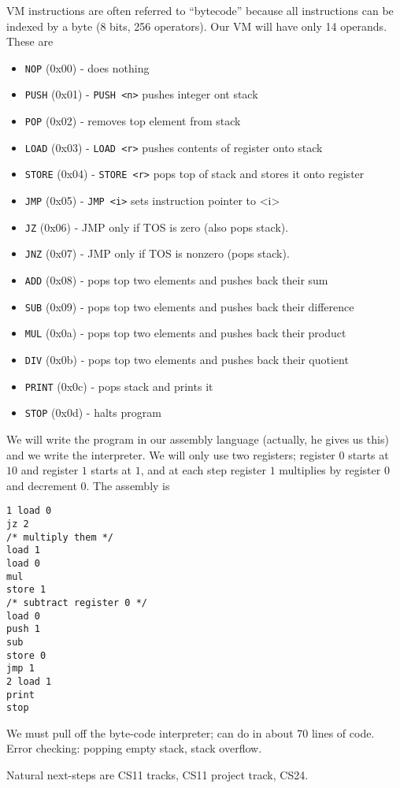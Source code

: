 \documentclass[10pt,landscape, twocolumn]{article}
\begin{document}
VM instructions are often referred to ``bytecode'' because all instructions can be indexed by a byte (8 bits, 256 operators). Our VM will have only 14 operands. These are
\begin{itemize}
    \item \texttt{NOP} (0x00) - does nothing
    \item \texttt{PUSH} (0x01) - \texttt{PUSH <n>} pushes integer ont stack
    \item \texttt{POP} (0x02) - removes top element from stack
    \item \texttt{LOAD} (0x03) - \texttt{LOAD <r>} pushes contents of register onto stack
    \item \texttt{STORE} (0x04) - \texttt{STORE <r>} pops top of stack and stores it onto register
    \item \texttt{JMP} (0x05) - \texttt{JMP <i>} sets instruction pointer to <i>
    \item \texttt{JZ} (0x06) - JMP only if TOS is zero (also pops stack).
    \item \texttt{JNZ} (0x07) - JMP only if TOS is nonzero (pops stack).
    \item \texttt{ADD} (0x08) - pops top two elements and pushes back their sum
    \item \texttt{SUB} (0x09) - pops top two elements and pushes back their difference
    \item \texttt{MUL} (0x0a) - pops top two elements and pushes back their product
    \item \texttt{DIV} (0x0b) - pops top two elements and pushes back their quotient
    \item \texttt{PRINT} (0x0c) - pops stack and prints it
    \item \texttt{STOP} (0x0d) - halts program
\end{itemize}

We will write the program in our assembly language (actually, he gives us this) and we write the interpreter. We will only use two  registers; register $0$ starts at $10$ and register $1$ starts at $1$, and at each step register $1$ multiplies by register $0$ and decrement $0$. The assembly is
\begin{verbatim}
1 load 0
jz 2
/* multiply them */ 
load 1
load 0
mul
store 1
/* subtract register 0 */
load 0
push 1
sub
store 0
jmp 1
2 load 1
print
stop
\end{verbatim}

We must pull off the byte-code interpreter; can do in about 70 lines of code. Error checking: popping empty stack, stack overflow. 

Natural next-steps are CS11 tracks, CS11 project track, CS24. 
\end{document}
